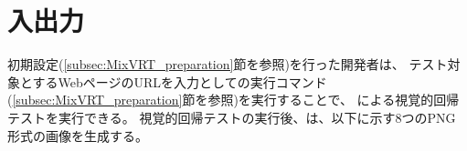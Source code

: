 \section{入出力}\label{subsec:MixVRT_IO}
初期設定(\ref{subsec:MixVRT_preparation}節を参照)を行った開発者は、
テスト対象とするWebページのURLを入力として\toolName の実行コマンド(\ref{subsec:MixVRT_preparation}節を参照)を実行することで、
\toolName による視覚的回帰テストを実行できる。
視覚的回帰テストの実行後、\toolName は、以下に示す8つのPNG形式の画像を生成する。
